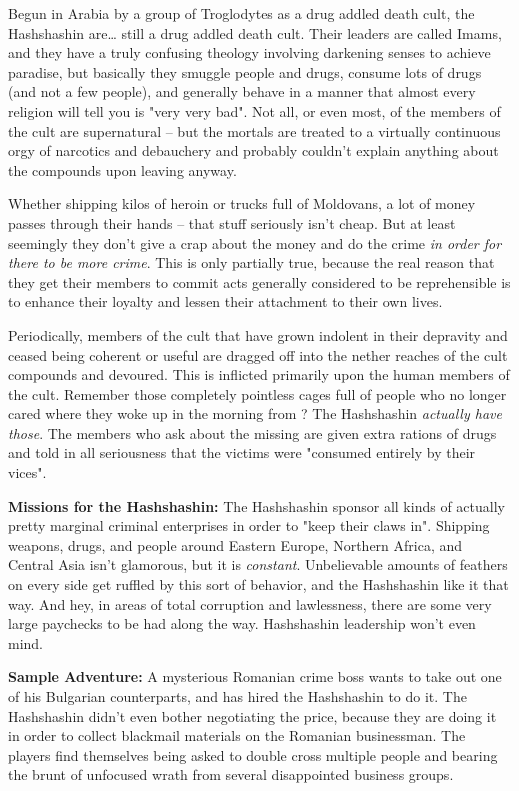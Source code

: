 Begun in Arabia by a group of Troglodytes as a drug addled death cult, the Hashshashin are\ldots{} still a drug addled death cult. Their leaders are called Imams, and they have a truly confusing theology involving darkening senses to achieve paradise, but basically they smuggle people and drugs, consume lots of drugs (and not a few people), and generally behave in a manner that almost every religion will tell you is "very very bad". Not all, or even most, of the members of the cult are supernatural -- but the mortals are treated to a virtually continuous orgy of narcotics and debauchery and probably couldn't explain anything about the compounds upon leaving anyway.

Whether shipping kilos of heroin or trucks full of Moldovans, a lot of money passes through their hands -- that stuff seriously isn't cheap. But at least seemingly they don't give a crap about the money and do the crime \textit{in order for there to be more crime}. This is only partially true, because the real reason that they get their members to commit acts generally considered to be reprehensible is to enhance their loyalty and lessen their attachment to their own lives.

Periodically, members of the cult that have grown indolent in their depravity and ceased being coherent or useful are dragged off into the nether reaches of the cult compounds and devoured. This is inflicted primarily upon the human members of the cult. Remember those completely pointless cages full of people who no longer cared where they woke up in the morning from ? The Hashshashin \textit{actually have those}. The members who ask about the missing are given extra rations of drugs and told in all seriousness that the victims were "consumed entirely by their vices". 

\textbf{Missions for the Hashshashin:} The Hashshashin sponsor all kinds of actually pretty marginal criminal enterprises in order to "keep their claws in". Shipping weapons, drugs, and people around Eastern Europe, Northern Africa, and Central Asia isn't glamorous, but it is \textit{constant}. Unbelievable amounts of feathers on every side get ruffled by this sort of behavior, and the Hashshashin like it that way. And hey, in areas of total corruption and lawlessness, there are some very large paychecks to be had along the way. Hashshashin leadership won't even mind.

\textbf{Sample Adventure:} A mysterious Romanian crime boss wants to take out one of his Bulgarian counterparts, and has hired the Hashshashin to do it. The Hashshashin didn't even bother negotiating the price, because they are doing it in order to collect blackmail materials on the Romanian businessman. The players find themselves being asked to double cross multiple people and bearing the brunt of unfocused wrath from several disappointed business groups.

